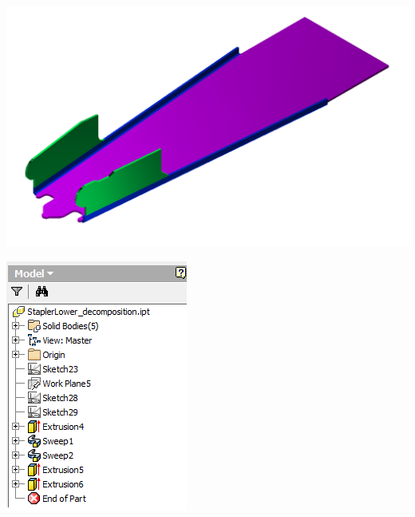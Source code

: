 \begin{minipage}{\linewidth}
\begin{minipage}[c]{0.62\linewidth}
\includegraphics[width=\linewidth,valign=t]{../Common/images/StaplerLower_decomposition_model}
 \label{fig:results:StaplerLower_decompositionmodel}
\end{minipage}
\quad
\begin{minipage}[c]{0.3\linewidth}
\includegraphics[width=\linewidth,valign=t]{../Common/images/StaplerLower_decomposition_tree}
 \label{fig:results:StaplerLower_decompositiontree}
\end{minipage}
\end{minipage}

